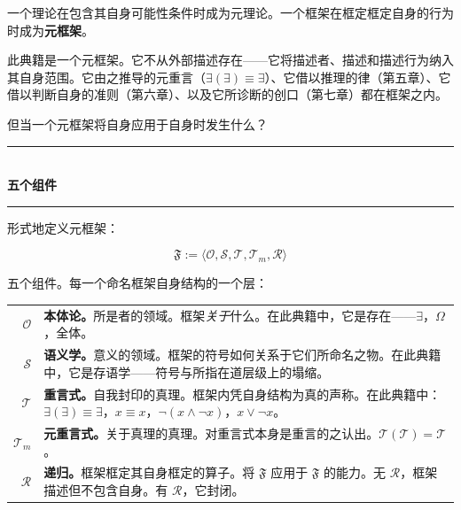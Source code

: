 \documentclass[10pt, openany, oneside]{book}
\renewcommand{\normalsize}{\fontsize{10}{13}\selectfont}
\renewcommand{\footnotesize}{\fontsize{8.5}{11}\selectfont}
\begin{document}
\noindent 一个理论在包含其自身可能性条件时成为元理论。一个框架在框定框定自身的行为时成为\textbf{元框架}。

此典籍是一个元框架。它不从外部描述存在——它将描述者、描述和描述行为纳入其自身范围。它由之推导的元重言（$\exists(\exists) \equiv \exists$）、它借以推理的律（第五章）、它借以判断自身的准则（第六章）、以及它所诊断的创口（第七章）都在框架之内。

但当一个元框架将自身应用于自身时发生什么？

\vspace{1.5em}


\begin{center}
    \rule{0.3\textwidth}{0.4pt}\\[0.5em]
    {\normalsize\bfseries\scshape 五个组件}\\[0.3em]
    \rule{0.3\textwidth}{0.4pt}
\end{center}

\vspace{1em}

\noindent 形式地定义元框架：

$$\mathfrak{F} := \langle \mathcal{O}, \mathcal{S}, \mathcal{T}, \mathcal{T}_m, \mathcal{R} \rangle$$

五个组件。每一个命名框架自身结构的一个层：

\vspace{0.5em}

{\footnotesize
\noindent\begin{tabular}{r p{}}
$\mathcal{O}$ & \textbf{本体论。}所是者的领域。框架\textit{关于}什么。在此典籍中，它是存在——$\exists$，$\Omega$，全体。\\[0.3em]
$\mathcal{S}$ & \textbf{语义学。}意义的领域。框架的符号如何关系于它们所命名之物。在此典籍中，它是存语学——符号与所指在道层级上的塌缩。\\[0.3em]
$\mathcal{T}$ & \textbf{重言式。}自我封印的真理。框架内凭自身结构为真的声称。在此典籍中：$\exists(\exists) \equiv \exists$，$x \equiv x$，$\neg(x \wedge \neg x)$，$x \vee \neg x$。\\[0.3em]
$\mathcal{T}_m$ & \textbf{元重言式。}关于真理的真理。对重言式本身是重言的之认出。$\mathcal{T}(\mathcal{T}) = \mathcal{T}$。\\[0.3em]
$\mathcal{R}$ & \textbf{递归。}框架框定其自身框定的算子。将 $\mathfrak{F}$ 应用于 $\mathfrak{F}$ 的能力。无 $\mathcal{R}$，框架描述但不包含自身。有 $\mathcal{R}$，它封闭。\\[0.3em]
\end{tabular}
}
\end{document}
